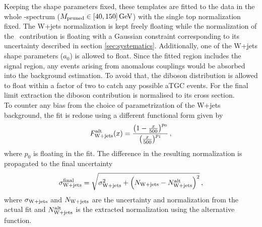 \noindent Keeping the shape parameters fixed, these templates are fitted to the data in the whole \Mpr -spectrum ($M_\mathrm{pruned} \in [40,150]\,{\rm GeV}$) with the single top normalization fixed. The W+jets normalization is kept freely floating while the normalization of the \ttbar \ contribution is floating with a Gaussian constraint corresponding to its uncertainty described in section \ref{sec:systematics}. Additionally, one of the W+jets shape parameters ($a_0$) is allowed to float. Since the fitted region includes the signal region, any events arising from anomalous couplings would be absorbed into the background estimation. To avoid that, the diboson distribution is allowed to float within a factor of two to catch any possible aTGC events. For the final limit extraction the diboson contribution is normalised to its cross section.\\

\noindent To counter any bias from the choice of parametrization of the W+jets background, the fit is redone using a different functional form given by
\begin{equation}
F_{\rm W+jets}^{\rm alt}(x)=\frac{\left(1-\frac{x}{500}\right)^{p_0}}{\left(\frac{x}{500}\right)^{p_1}} \, ,
\end{equation}
where $p_0$ is floating in the fit. The difference in the resulting normalization is propagated to the final uncertainty
\begin{equation}
\sigma_{\rm W+jets}^{\rm final} = \sqrt{\sigma_{\rm W+jets}^2 + \left(N_{\rm W+jets} - N_{\rm W+jets}^{\rm alt}\right)^2} \, ,
\label{eq:bkg:wjetsunc}
\end{equation}
where $\sigma_{\rm W+jets}$ and $N_{\rm W+jets}$ are the uncertainty and normalization from the actual fit and $N_{\rm W+jets}^{\rm alt}$ is the extracted normalization using the alternative function. \\

